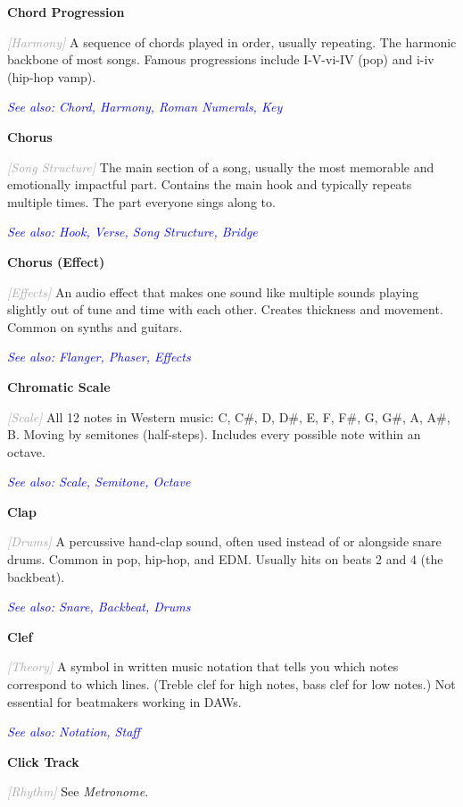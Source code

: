 \documentclass[11pt,letterpaper]{article}
\newcommand{\term}[1]{\textbf{\large\color{purple}#1}}
\newcommand{\category}[1]{\textcolor{darkgray}{\textit{\small [#1]}}}
\newcommand{\seealso}[1]{\textcolor{blue}{\textit{See also: #1}}}
\newenvironment{termdef}[1]
  {\noindent\term{#1}\par\nopagebreak}
  {\par\vspace{0.3em}}
\begin{document}
\begin{termdef}{Chord Progression}
\category{Harmony}
A sequence of chords played in order, usually repeating. The harmonic backbone of most songs. Famous progressions include I-V-vi-IV (pop) and i-iv (hip-hop vamp).

\seealso{Chord, Harmony, Roman Numerals, Key}
\end{termdef}

\begin{termdef}{Chorus}
\category{Song Structure}
The main section of a song, usually the most memorable and emotionally impactful part. Contains the main hook and typically repeats multiple times. The part everyone sings along to.

\seealso{Hook, Verse, Song Structure, Bridge}
\end{termdef}

\begin{termdef}{Chorus (Effect)}
\category{Effects}
An audio effect that makes one sound like multiple sounds playing slightly out of tune and time with each other. Creates thickness and movement. Common on synths and guitars.

\seealso{Flanger, Phaser, Effects}
\end{termdef}

\begin{termdef}{Chromatic Scale}
\category{Scale}
All 12 notes in Western music: C, C\#, D, D\#, E, F, F\#, G, G\#, A, A\#, B. Moving by semitones (half-steps). Includes every possible note within an octave.

\seealso{Scale, Semitone, Octave}
\end{termdef}

\begin{termdef}{Clap}
\category{Drums}
A percussive hand-clap sound, often used instead of or alongside snare drums. Common in pop, hip-hop, and EDM. Usually hits on beats 2 and 4 (the backbeat).

\seealso{Snare, Backbeat, Drums}
\end{termdef}

\begin{termdef}{Clef}
\category{Theory}
A symbol in written music notation that tells you which notes correspond to which lines. (Treble clef for high notes, bass clef for low notes.) Not essential for beatmakers working in DAWs.

\seealso{Notation, Staff}
\end{termdef}

\begin{termdef}{Click Track}
\category{Rhythm}
See \textit{Metronome}.
\end{termdef}
\end{document}
